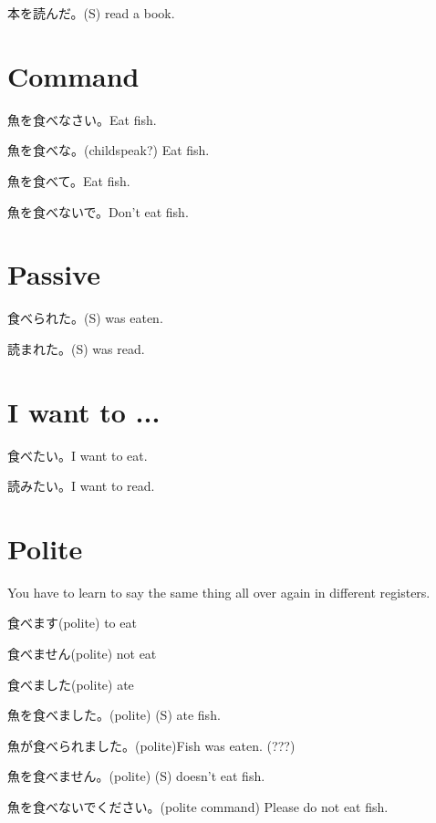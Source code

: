 \documentclass[12pt,a4paper,openany]{book}
\begin{document}
本を読んだ。(S) read a book.

\section{Command}

魚を食べなさい。Eat fish.

魚を食べな。(childspeak?) Eat fish.

魚を食べて。Eat fish.

魚を食べないで。Don't eat fish.

\section{Passive}

食べられた。(S) was eaten.

読まれた。(S) was read.

\section{I want to ...}

食べたい。I want to eat.

読みたい。I want to read.

\section{Polite}

You have to learn to say the same thing all over again in different registers.

食べます(polite) to eat

食べません(polite) not eat

食べました(polite) ate

魚を食べました。(polite) (S) ate fish.

魚が食べられました。(polite)Fish was eaten. (???)

魚を食べません。(polite) (S) doesn't eat fish.

魚を食べないでください。(polite command) Please do not eat fish.








\end{document}
